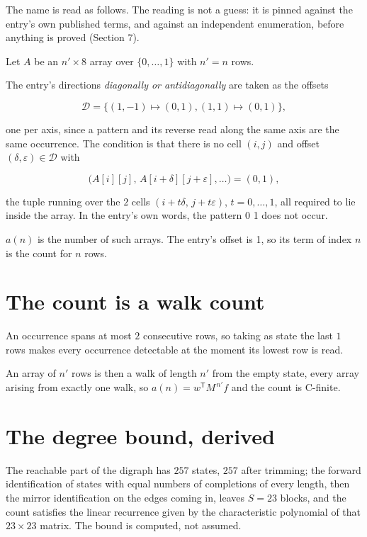 \documentclass[11pt]{article}
\theoremstyle{definition}
\begin{document}
The name is read as follows. The reading is not a guess: it is pinned against the entry's own published terms, and against an independent enumeration, before anything is proved (Section 7).

Let $A$ be an $n' \times 8$ array over $\{0,\dots,1\}$ with $n' = n$ rows.

The entry's directions {\itshape diagonally or antidiagonally} are taken as the offsets

\[\mathcal{D} = \{(1,-1)\mapsto(0,1), (1,1)\mapsto(0,1)\},\]

one per axis, since a pattern and its reverse read along the same axis are the same occurrence. The condition is that there is no cell $(i,j)$ and offset $(\delta,\varepsilon)\in\mathcal{D}$ with

\[\bigl(A[i][j],\,A[i{+}\delta][j{+}\varepsilon],\dots\bigr) = (0, 1),\]

the tuple running over the $2$ cells $(i+t\delta,\,j+t\varepsilon)$, $t = 0,\dots,1$, all required to lie inside the array. In the entry's own words, the pattern 0 1 does not occur.

$a(n)$ is the number of such arrays. The entry's offset is 1, so its term of index $n$ is the count for $n$ rows.

\section{The count is a walk count}

An occurrence spans at most $2$ consecutive rows, so taking as state the last $1$ rows makes every occurrence detectable at the moment its lowest row is read.

An array of $n'$ rows is then a walk of length $n'$ from the empty state, every array arising from exactly one walk, so $a(n) = w^{\mathsf T}M^{\,n'}f$ and the count is C-finite.

\section{The degree bound, derived}

The reachable part of the digraph has $257$ states, $257$ after trimming; the forward identification of states with equal numbers of completions of every length, then the mirror identification on the edges coming in, leaves $S = 23$ blocks, and the count satisfies the linear recurrence given by the characteristic polynomial of that $23\times23$ matrix. The bound is computed, not assumed.
\end{document}
